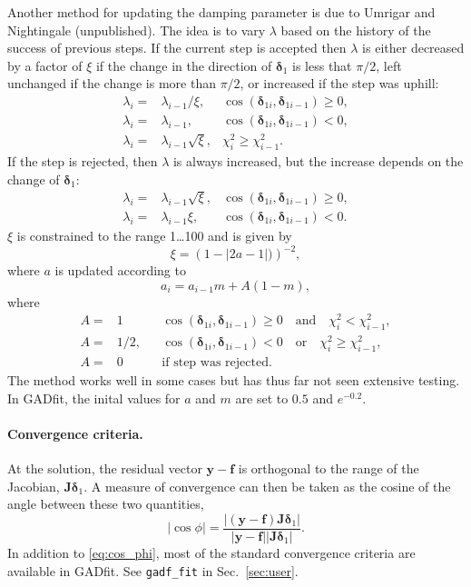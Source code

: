 \documentclass{article}
\begin{document}
Another method for updating the damping parameter is due to Umrigar and Nightingale (unpublished). The idea is to vary $\lambda$ based on the history of the success of previous steps. If the current step is accepted then $\lambda$ is either decreased by a factor of $\xi$ if the change in the direction of $\bm\delta_1$ is less that $\pi/2$, left unchanged if the change is more than $\pi/2$, or increased if the step was uphill:
\begin{align}
  \label{eq:umnigh_lambda_acc}
  \lambda_i =& \lambda_{i-1}/\xi,
  & \cos(\bm\delta_{1i},\bm\delta_{1i-1}) \ge 0, \\
  \lambda_i =& \lambda_{i-1}, & \cos(\bm\delta_{1i},\bm\delta_{1i-1})
                                < 0, \\
  \lambda_i =& \lambda_{i-1}\sqrt{\xi}, & \chi_i^2 \ge \chi_{i-1}^2.
\end{align}
If the step is rejected, then $\lambda$ is always increased, but the
increase depends on the change of $\bm\delta_1$:
\begin{align}
  \label{eq:umnigh_lambda_rej}
  \lambda_i =& \lambda_{i-1}\sqrt{\xi},
  & \cos(\bm\delta_{1i},\bm\delta_{1i-1}) \ge 0, \\
  \lambda_i =& \lambda_{i-1}\xi, & \cos(\bm\delta_{1i},\bm\delta_{1i-1})
                                   < 0.
\end{align}
$\xi$ is constrained to the range 1\ldots100 and is given by
\begin{equation}
  \label{eq:umnigh_xi}
  \xi = \left( 1-|2a-1|) \right)^{-2},
\end{equation}
where $a$ is updated according to
\begin{equation}
  \label{eq:umnigh_a_update}
  a_i = a_{i-1}m + A(1-m),
\end{equation}
where
\begin{align}
  \label{eq:umnigh_A_update}
  A =& 1 && \cos(\bm\delta_{1i},\bm\delta_{1i-1}) \ge 0 \quad
            \text{and} \quad \chi_i^2 < \chi_{i-1}^2, \\
  A =& 1/2, && \cos(\bm\delta_{1i},\bm\delta_{1i-1})
               < 0 \quad \text{or} \quad \chi_i^2 \ge \chi_{i-1}^2, \\
  A =& 0 && \text{if step was rejected}.
\end{align}
The method works well in some cases but has thus far not seen extensive testing. In GADfit, the inital values for $a$ and $m$ are set to $0.5$ and $e^{-0.2}$.

\paragraph{Convergence criteria.} At the solution, the residual vector $\bm y - \bm f$ is orthogonal to the range of the Jacobian, $\bm J\bm\delta_1$. A measure of convergence can then be taken as the cosine of the angle between these two quantities,
\begin{equation}
  \label{eq:cos_phi}
  |\cos\phi| = \frac{|(\bm y - \bm f) \bm J\bm \delta_1|}{|\bm y - \bm
    f||\bm J\bm \delta_1|}.
\end{equation}
In addition to \eqref{eq:cos_phi}, most of the standard convergence criteria are available in GADfit. See \verb+gadf_fit+ in Sec.~\ref{sec:user}.
\end{document}
